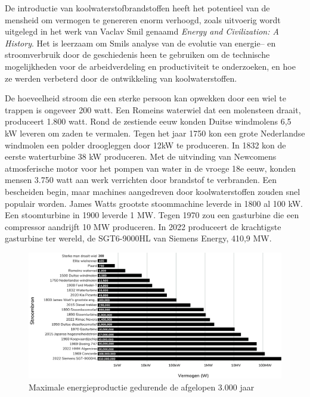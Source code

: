 De introductie van koolwaterstofbrandstoffen heeft het potentieel van de mensheid om vermogen te genereren enorm verhoogd, zoals uitvoerig wordt uitgelegd in het werk van Vaclav Smil genaamd \emph{Energy and Civilization: A History}. \autocite{96} Het is leerzaam om Smil\textquotesingle s analyse van de evolutie van energie-- en stroomverbruik door de geschiedenis heen te gebruiken om de technische mogelijkheden voor de arbeidverdeling en productiviteit te onderzoeken, en hoe ze werden verbeterd door de ontwikkeling van koolwaterstoffen.

De hoeveelheid stroom die een sterke persoon kan opwekken door een wiel te trappen is ongeveer 200 watt. Een Romeins waterwiel dat een molensteen draait, produceert 1.800 watt. Rond de zestiende eeuw konden Duitse windmolens 6,5 kW leveren om zaden te vermalen. Tegen het jaar 1750 kon een grote Nederlandse windmolen een polder droogleggen door 12kW te produceren. In 1832 kon de eerste waterturbine 38 kW produceren. Met de uitvinding van Newcomen\textquotesingle s atmosferische motor voor het pompen van water in de vroege 18e eeuw, konden mensen 3.750 watt aan werk verrichten door brandstof te verbranden. Een bescheiden begin, maar machines aangedreven door koolwaterstoffen zouden snel populair worden. James Watt\textquotesingle s grootste stoommachine leverde in 1800 al 100 kW. Een stoomturbine in 1900 leverde 1 MW. Tegen 1970 zou een gasturbine die een compressor aandrijft 10 MW produceren. In 2022 produceert de krachtigste gasturbine ter wereld, de SGT6-9000HL van Siemens Energy, 410,9 MW.

\begin{figure}[!htb]
\centering
    \includegraphics[width=\textwidth]{figures/fig9.pdf}
    \caption[Maximale energieproductie gedurende de afgelopen 3.000 jaar]{Maximale energieproductie gedurende de afgelopen 3.000 jaar}
    \label{fig9}
\end{figure}


